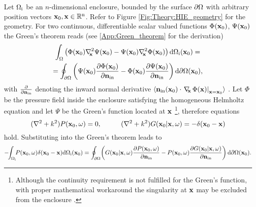 Let $\Omega_{\mathrm{i}}$ be an $n$-dimensional enclosure, bounded by the surface $\partial \Omega$ with arbitrary position vectors $\mathbf{x}_0, \mathbf{x} \in \mathbb{R}^{\mathrm{n}}$. 
Refer to Figure \ref{Fig:Theory:HIE_geometry} for the geometry. 
For two continuous, differentiable scalar valued functions $\Phi(\mathbf{x}_0)$, $\Psi(\mathbf{x}_0)$ the Green's theorem reads (see \ref{App:Green_theorem} for the derivation)
\begin{multline}
\int_{\Omega}
\left(  \Phi(\mathbf{x}_0) \nabla^2_{\!\!\mathbf{x}} \Psi(\mathbf{x}_0) - \Psi(\mathbf{x}_0) \nabla^2_{\!\!\mathbf{x}} \Phi(\mathbf{x}_0)   \right)   \mathrm{d} \Omega_{\mathrm{i}}(\mathbf{x}_0)=  \\  =
\oint_{\partial \Omega}  \left(  \Psi(\mathbf{x}_0) \frac{\partial \Phi(\mathbf{x}_0)}{\partial \mathbf{n}_{\mathrm{in}}}  - \Phi(\mathbf{x}_0) \frac{\partial \Psi(\mathbf{x}_0)}{\partial \mathbf{n}_{\mathrm{in}}}  \right)   \mathrm{d} \partial \Omega(\mathbf{x}_0),
\label{Eq:Theory:Greens-theorem}
\end{multline}
with $\frac{\partial}{\partial \mathbf{n}_{\mathrm{in}}}$ denoting the inward normal derivative $\langle \mathbf{n}_{\mathrm{in}}(\mathbf{x}_0) \cdot \left. \nabla_{\!\!\mathbf{x}}\, \Phi(\mathbf{x})\right|_{\mathbf{x} = \mathbf{x}_0} \rangle$
.
Let $\Phi$ be the pressure field inside the enclosure satisfying the homogeneous Helmholtz equation and let $\Psi$ be the Green's function located at $\mathbf{x}$
\footnote{Although the continuity requirement is not fulfilled for the Green's function, with proper mathematical workaround the singularity at $\mathbf{x}$ may be excluded from the enclosure \cite{Williams1999}.}, therefore equations
\begin{equation}
(\nabla^2 + k^2)P(\vxo,\omega) = 0, \hspace{10mm}
(\nabla^2 + k^2)G(\vxo|\vx,\omega) = -\delta(\vxo - \vx)
\end{equation}
hold.
Substituting into the Green's theorem leads to
\begin{equation}
\small
-\!\! \int_{\Omega_{\mathrm{i}}} \!\!P(\mathbf{x}_0,\omega) \delta(\mathbf{x}_0 - \mathbf{x})
  \mathrm{d} \Omega_{\mathrm{i}}(\mathbf{x}_0) = 
\oint_{\partial \Omega} \! \left( G(\mathbf{x}_0|\mathbf{x},\omega) \frac{\partial P(\mathbf{x}_0,\omega)}{\partial \mathbf{n}_{\mathrm{in}}}  - P(\mathbf{x}_0,\omega)  \frac{\partial G(\mathbf{x}_0|\mathbf{x},\omega)}{\partial \mathbf{n}_{\mathrm{in}}} \right) \mathrm{d} \partial \Omega(\mathbf{x}_0).
\end{equation}


